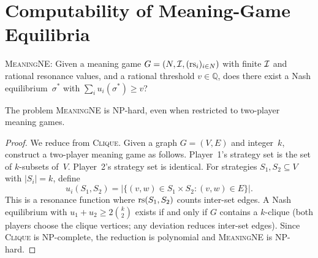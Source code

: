 \section{Computability of Meaning-Game Equilibria}
\label{sec:equilibrium-computation}

\begin{definition}
\label{def:equilibrium-decision}
\textsc{MeaningNE}: Given a meaning game
$G = (N, \mathcal{I}, (\mathrm{rs}_i)_{i\in N})$ with finite $\mathcal{I}$ and rational
resonance values, and a rational threshold $v \in \mathbb{Q}$,
does there exist a Nash equilibrium~$\sigma^*$ with
$\sum_i u_i(\sigma^*) \ge v$?
\end{definition}

\begin{theorem}
\label{thm:ne-hard}
The problem \textsc{MeaningNE} is NP-hard, even when restricted
to two-player meaning games.
\end{theorem}

\begin{proof}
We reduce from \textsc{Clique}.  Given a graph $G = (V,E)$ and
integer~$k$, construct a two-player meaning game as follows.
Player~1's strategy set is the set of $k$-subsets of~$V$.
Player~2's strategy set is identical.  For strategies $S_1, S_2
\subseteq V$ with $|S_i| = k$, define
\[
  u_i(S_1, S_2) = \bigl|\{(v,w) \in S_1 \times S_2 : (v,w) \in E\}\bigr|.
\]
This is a resonance function where $\mathrm{rs}(S_1, S_2)$ counts
inter-set edges.  A Nash equilibrium with $u_1 + u_2 \ge 2\binom{k}{2}$
exists if and only if $G$ contains a $k$-clique (both players
choose the clique vertices; any deviation reduces inter-set
edges).  Since \textsc{Clique} is NP-complete, the reduction
is polynomial and \textsc{MeaningNE} is NP-hard.
\end{proof}

